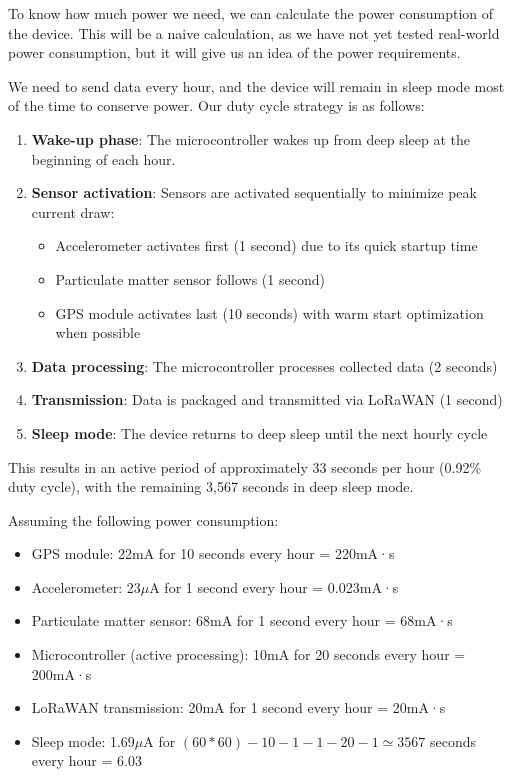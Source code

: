 To know how much power we need, we can calculate the power consumption of the device. This will be a naive calculation, as we have not yet tested real-world power consumption, but it will give us an idea of the power requirements.

We need to send data every hour, and the device will remain in sleep mode most of the time to conserve power. Our duty cycle strategy is as follows:

\begin{enumerate}
  \item \textbf{Wake-up phase}: The microcontroller wakes up from deep sleep at the beginning of each hour.
  \item \textbf{Sensor activation}: Sensors are activated sequentially to minimize peak current draw:
  \begin{itemize}
    \item Accelerometer activates first (1 second) due to its quick startup time
    \item Particulate matter sensor follows (1 second) 
    \item GPS module activates last (10 seconds) with warm start optimization when possible
  \end{itemize}
  \item \textbf{Data processing}: The microcontroller processes collected data (2 seconds)
  \item \textbf{Transmission}: Data is packaged and transmitted via LoRaWAN (1 second)
  \item \textbf{Sleep mode}: The device returns to deep sleep until the next hourly cycle
\end{enumerate}

This results in an active period of approximately 33 seconds per hour (0.92\% duty cycle), with the remaining 3,567 seconds in deep sleep mode.

Assuming the following power consumption:
\begin{itemize}
  \item GPS module: 22mA for 10 seconds every hour = 220mA·s
  \item Accelerometer: 23$\mu$A for 1 second every hour = 0.023mA·s
  \item Particulate matter sensor: 68mA for 1 second every hour = 68mA·s
  \item Microcontroller (active processing): 10mA for 20 seconds every hour = 200mA·s
  \item LoRaWAN transmission: 20mA for 1 second every hour = 20mA·s
  \item Sleep mode: 1.69$\mu$A for $(60*60) - 10 - 1 - 1 - 20 - 1 \simeq 3567$ seconds every hour = 6.03
\end{itemize}

